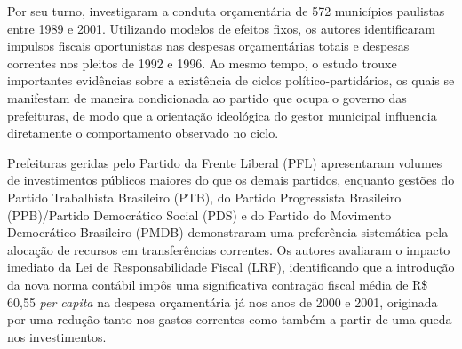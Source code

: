 Por seu turno, \textcite{sakurai2007} investigaram a conduta orçamentária de 572 municípios paulistas entre 1989 e 2001. Utilizando modelos de efeitos fixos, os autores identificaram impulsos fiscais oportunistas nas despesas orçamentárias totais e despesas correntes nos pleitos de 1992 e 1996. Ao mesmo tempo, o estudo trouxe importantes evidências sobre a existência de ciclos político-partidários, os quais se manifestam de maneira condicionada ao partido que ocupa o governo das prefeituras, de modo que a orientação ideológica do gestor municipal influencia diretamente o comportamento observado no ciclo.

Prefeituras geridas pelo Partido da Frente Liberal (PFL) apresentaram volumes de investimentos públicos maiores do que os demais partidos, enquanto gestões do Partido Trabalhista Brasileiro (PTB), do Partido Progressista Brasileiro (PPB)/Partido Democrático Social (PDS) e do Partido do Movimento Democrático Brasileiro (PMDB) demonstraram uma preferência sistemática pela alocação de recursos em transferências correntes. Os autores avaliaram o impacto imediato da Lei de Responsabilidade Fiscal (LRF), identificando que a introdução da nova norma contábil impôs uma significativa contração fiscal média de R\$ 60,55 \textit{per capita} na despesa orçamentária já nos anos de 2000 e 2001, originada por uma redução tanto nos gastos correntes como também a partir de uma queda nos investimentos.

